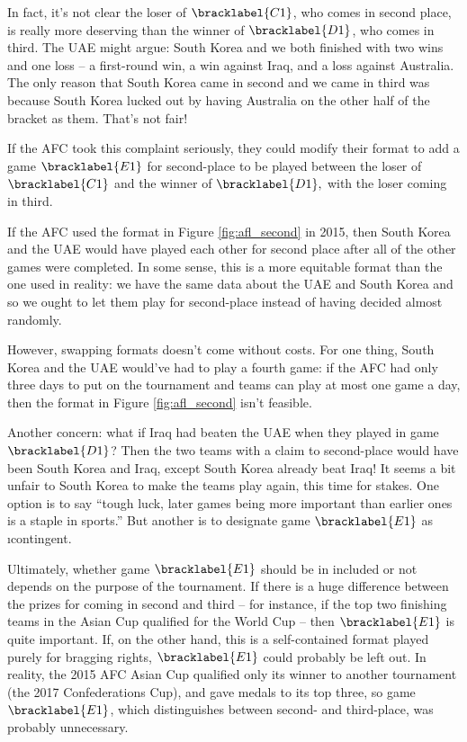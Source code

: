 {    In fact, it's not clear the loser of $\bracklabel{C1}$, who comes in second place, is really more deserving than the winner of $\bracklabel{D1}$, who comes in third. The UAE might argue: South Korea and we both finished with two wins and one loss -- a first-round win, a win against Iraq, and a loss against Australia. The only reason that South Korea came in second and we came in third was because South Korea lucked out by having Australia on the other half of the bracket as them. That's not fair!

    If the AFC took this complaint seriously, they could modify their format to add a game $\bracklabel{E1}$ for second-place to be played between the loser of $\bracklabel{C1}$ and the winner of $\bracklabel{D1},$ with the loser coming in third.


    If the AFC used the format in Figure \ref{fig:afl_second} in 2015, then South Korea and the UAE would have played each other for second place after all of the other games were completed. In some sense, this is a more equitable format than the one used in reality: we have the same data about the UAE and South Korea and so we ought to let them play for second-place instead of having decided almost randomly.

    However, swapping formats doesn't come without costs. For one thing, South Korea and the UAE would've had to play a fourth game: if the AFC had only three days to put on the tournament and teams can play at most one game a day, then the format in Figure \ref{fig:afl_second} isn't feasible.

    Another concern: what if Iraq had beaten the UAE when they played in game $\bracklabel{D1}$? Then the two teams with a claim to second-place would have been South Korea and Iraq, except South Korea already beat Iraq! It seems a bit unfair to South Korea to make the teams play again, this time for stakes. One option is to say ``tough luck, later games being more important than earlier ones is a staple in sports.'' But another is to designate game $\bracklabel{E1}$ as \i{contingent}.


    Ultimately, whether game $\bracklabel{E1}$ should be in included or not depends on the purpose of the tournament. If there is a huge difference between the prizes for coming in second and third -- for instance, if the top two finishing teams in the Asian Cup qualified for the World Cup -- then $\bracklabel{E1}$ is quite important. If, on the other hand, this is a self-contained format played purely for bragging rights, $\bracklabel{E1}$ could probably be left out. In reality, the 2015 AFC Asian Cup qualified only its winner to another tournament (the 2017 Confederations Cup), and gave medals to its top three, so game $\bracklabel{E1}$, which distinguishes between second- and third-place, was probably unnecessary.

}
